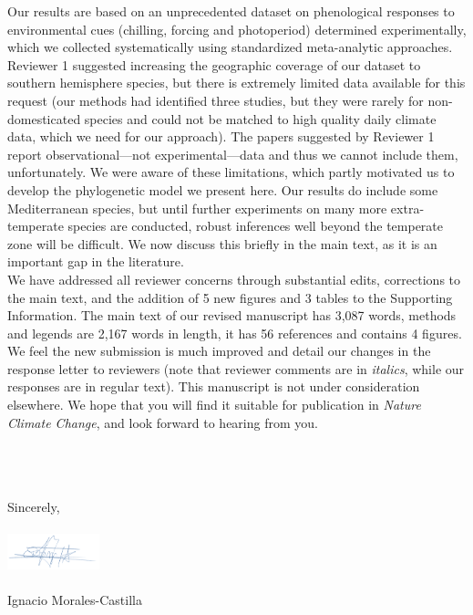 \documentclass[11pt,a4paper]{letter}
\begin{document}
\begin{letter}{}
Our results are based on an unprecedented dataset on phenological responses to environmental cues (chilling, forcing and photoperiod) determined experimentally, which we collected systematically using standardized meta-analytic approaches. Reviewer 1 suggested increasing the geographic coverage of our dataset to southern hemisphere species, but there is extremely limited data available for this request (our methods had identified three studies, but they were rarely for non-domesticated species and could not be matched to high quality daily climate data, which we need for our approach). The papers suggested by Reviewer 1 report observational---not experimental---data and thus we cannot include them, unfortunately. We were aware of these limitations, which partly motivated us to develop the phylogenetic model we present here. Our results do include some Mediterranean species, but until further experiments on many more extra-temperate species are conducted, robust inferences well beyond the temperate zone will be difficult. We now discuss this briefly in the main text, as it is an important gap in the literature. %
\vspace{1.5ex}\\
We have addressed all reviewer concerns through substantial edits, corrections to the main text, and the addition of 5 new figures and 3 tables to the Supporting Information. The main text of our revised manuscript has 3,087 words, methods and legends are 2,167 words in length, it has 56 references and contains 4 figures. We feel the new submission is much improved and detail our changes in the response letter to reviewers (note that reviewer comments are in \emph{italics}, while our responses are in regular text).  This manuscript is not under consideration elsewhere.  We hope that you will find it suitable for publication in \emph{Nature Climate Change}, and look forward to hearing from you.


\vspace{0.25ex}\\
\vspace{1.5ex}\\


\vspace{1.5ex}\\
\noindent Sincerely,\\
\vspace{1.5ex}\\
 \includegraphics[width=0.2\textwidth]{Signature_IMC.png} \\
 \vspace{1.5ex}\\
\noindent Ignacio Morales-Castilla


\end{letter}
\end{document}
